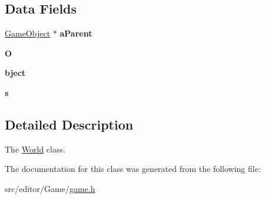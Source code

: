 \subsection*{\-Data \-Fields}
\begin{DoxyCompactItemize}
\item 
\hypertarget{class_world_af24924a1b6c6596b1c0a293651ffccaf}{\hyperlink{class_game_object}{\-Game\-Object} $\ast$ {\bfseries a\-Parent}}\label{class_world_af24924a1b6c6596b1c0a293651ffccaf}

\item 
\hypertarget{class_world_a180c9e33dc6e59ca8e097bc9e6a36503}{{\bfseries \-O}}\label{class_world_a180c9e33dc6e59ca8e097bc9e6a36503}

\item 
\hypertarget{class_world_a2c3ed57fb27e57a197a2218f196950e2}{{\bfseries bject}}\label{class_world_a2c3ed57fb27e57a197a2218f196950e2}

\item 
\hypertarget{class_world_a985aab8b792338c2a1718f4ec46f88dc}{{\bfseries s}}\label{class_world_a985aab8b792338c2a1718f4ec46f88dc}

\end{DoxyCompactItemize}


\subsection{\-Detailed \-Description}
\-The \hyperlink{class_world}{\-World} class. 

\-The documentation for this class was generated from the following file\-:\begin{DoxyCompactItemize}
\item 
src/editor/\-Game/\hyperlink{game_8h}{game.\-h}\end{DoxyCompactItemize}
